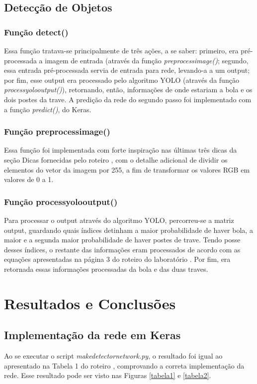 \documentclass[conference]{IEEEtran}
\begin{document}
\subsection{Detecção de Objetos}

\subsubsection{Função detect()}
Essa função tratava-se principalmente de três ações, a se saber: primeiro, era pré-processada a imagem de entrada (através da função \textit{preprocess\underline{\space}image()}; segundo, essa entrada pré-processada servia de entrada para rede, levando-a a um output; por fim, esse output era processado pelo algoritmo YOLO (através da função \textit{process\underline{\space}yolo\underline{\space}output()}), retornando, então, informações de onde estariam a bola e os dois postes da trave. A predição da rede do segundo passo foi implementado com a função \textit{predict()}, do Keras.

\subsubsection{Função preprocess\underline{\space}image()}
Essa função foi implementada com forte inspiração nas últimas três dicas da seção Dicas fornecidas pelo roteiro \cite{roteiro}, com o detalhe adicional de dividir os elementos do vetor da imagem por 255, a fim de transformar os valores RGB em valores de 0 a 1.

\subsubsection{Função process\underline{\space}yolo\underline{\space}output()}
Para processar o output através do algoritmo YOLO, percorreu-se a matriz output, guardando quais índices detinham a maior probabilidade de haver bola, a maior e a segunda maior probabilidade de haver postes de trave. Tendo posse desses índices, o restante das informações eram processados de acordo com as equações apresentadas na página 3 do roteiro do laboratório \cite{roteiro}. Por fim, era retornada essas informações processadas da bola e das duas traves.

\section{Resultados e Conclusões}

\subsection{Implementação da rede em Keras}
Ao se executar o script \textit{make\underline{\space}detector\underline{\space}network.py}, o resultado foi igual ao apresentado na Tabela 1 do roteiro \cite{roteiro}, comprovando a correta implementação da rede. Esse resultado pode ser visto nas Figuras \ref{tabela1} e \ref{tabela2}.
\end{document}
